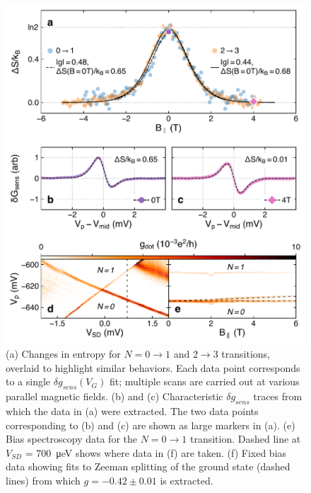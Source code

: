 \documentclass[twocolumn,showpacs,amsmath,amssymb,prl,aps,superscriptaddress]{revtex4-1}
\begin{document}
\begin{figure}
        \includegraphics[width=1.0\columnwidth]{../figures/figure_3.pdf}
        \caption{\label{fig:fig3}(a) Changes in entropy for $N=0 \rightarrow 1$ and $2 \rightarrow 3$ transitions, overlaid to highlight similar behaviors.  Each data point corresponds to a single $\delta g_{sens}(V_G)$ fit; multiple scans are carried out at various parallel magnetic fields.   (b) and (c) Characteristic $\delta g_{sens}$ traces from which the data in (a) were extracted. The two data points corresponding to (b) and (c) are shown as large markers in (a). (e) Bias spectroscopy data for the $N=0 \rightarrow 1$ transition. Dashed line at $V_{SD}$ = \SI{700}{\micro\electronvolt} shows where data in (f) are taken. (f) Fixed bias data showing fits to Zeeman splitting of the ground state (dashed lines) from which $g = -0.42 \pm 0.01$ is extracted.}
\end{figure}
\end{document}
